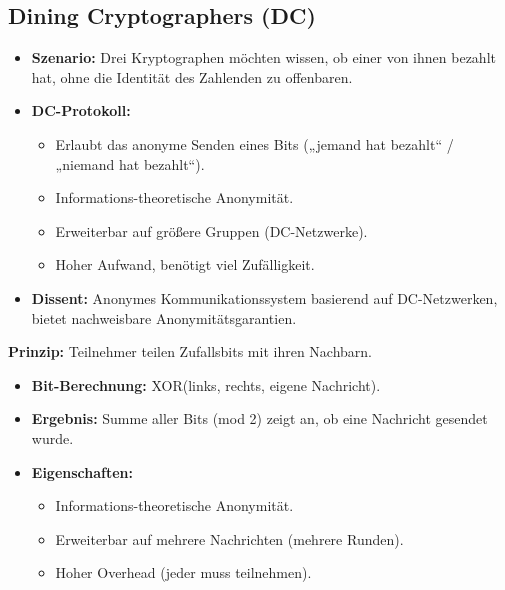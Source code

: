 \subsection{Dining Cryptographers (DC)}
\begin{itemize}
    \item \textbf{Szenario:} Drei Kryptographen möchten wissen, ob einer von ihnen bezahlt hat, ohne die Identität des Zahlenden zu offenbaren.
    \item \textbf{DC-Protokoll:} 
    \begin{itemize}
        \item Erlaubt das anonyme Senden eines Bits („jemand hat bezahlt“ / „niemand hat bezahlt“).
        \item Informations-theoretische Anonymität.
        \item Erweiterbar auf größere Gruppen (DC-Netzwerke).
        \item Hoher Aufwand, benötigt viel Zufälligkeit.
    \end{itemize}
    \item \textbf{Dissent:} Anonymes Kommunikationssystem basierend auf DC-Netzwerken, bietet nachweisbare Anonymitätsgarantien.
\end{itemize}
\noindent
\textbf{Prinzip:} Teilnehmer teilen Zufallsbits mit ihren Nachbarn.
\begin{itemize}
    \item \textbf{Bit-Berechnung:} XOR(links, rechts, eigene Nachricht).
    \item \textbf{Ergebnis:} Summe aller Bits (mod 2) zeigt an, ob eine Nachricht gesendet wurde.
    \item \textbf{Eigenschaften:}
    \begin{itemize}
        \item Informations-theoretische Anonymität.
        \item Erweiterbar auf mehrere Nachrichten (mehrere Runden).
        \item Hoher Overhead (jeder muss teilnehmen).
    \end{itemize}
\end{itemize}

